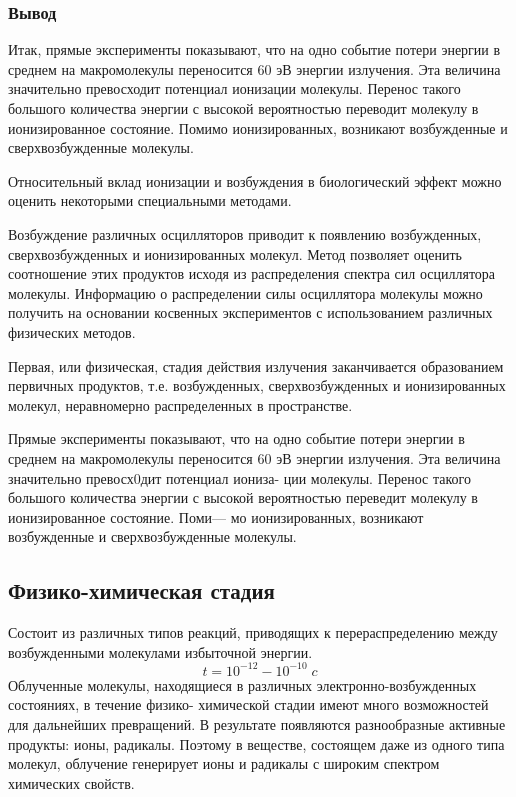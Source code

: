 \documentclass[a4paper, 14pt]{article}
\renewcommand{\emph}[1]{{\color{orange}{\textit{\textbf{#1}}}}}
\begin{document}
\subsubsection{Вывод}
Итак, прямые эксперименты показывают, что на одно событие потери энергии в
среднем на макромолекулы переносится 60 эВ энергии излучения. Эта величина
значительно превосходит потенциал ионизации молекулы. Перенос такого большого
количества энергии с высокой вероятностью переводит молекулу в ионизированное
состояние. Помимо ионизированных, возникают возбужденные и сверхвозбужденные
молекулы.

Относительный вклад ионизации и возбуждения в биологический эффект можно
оценить некоторыми специальными методами.

Возбуждение различных осцилляторов приводит к появлению возбужденных,
сверхвозбужденных и ионизированных молекул.
Метод \emph{«оптического приближения»} позволяет оценить соотношение этих продуктов исходя из
распределения спектра сил осциллятора молекулы. Информацию о распределении
силы осциллятора молекулы можно получить на основании косвенных экспериментов
с использованием различных физических методов.

Первая, или физическая, стадия действия излучения заканчивается образованием первичных продуктов, т.е. возбужденных, сверхвозбужденных и ионизированных молекул, неравномерно распределенных в пространстве.

Прямые эксперименты показывают, что на одно событие потери энергии в среднем на макромолекулы переносится 60 эВ энергии
излучения. Эта величина значительно превосх0дит потенциал иониза-
ции молекулы. Перенос такого большого количества энергии с высокой
вероятностью переведит молекулу в ионизированное состояние. Поми—
мо ионизированных, возникают возбужденные и сверхвозбужденные
молекулы.

\subsection{Физико-химическая стадия}
Состоит из различных типов реакций, приводящих к перераспределению между
возбужденными молекулами избыточной энергии.
\[ t = 10^{-12} - 10^{-10}\;c\]
Облученные молекулы, находящиеся в различных электронно-возбужденных
состояниях, в течение физико- химической стадии имеют много возможностей для
дальнейших превращений. В результате появляются разнообразные активные
продукты: ионы, радикалы. Поэтому в веществе, состоящем даже из одного типа
молекул, облучение генерирует ионы и радикалы с широким спектром химических
свойств.
\end{document}

